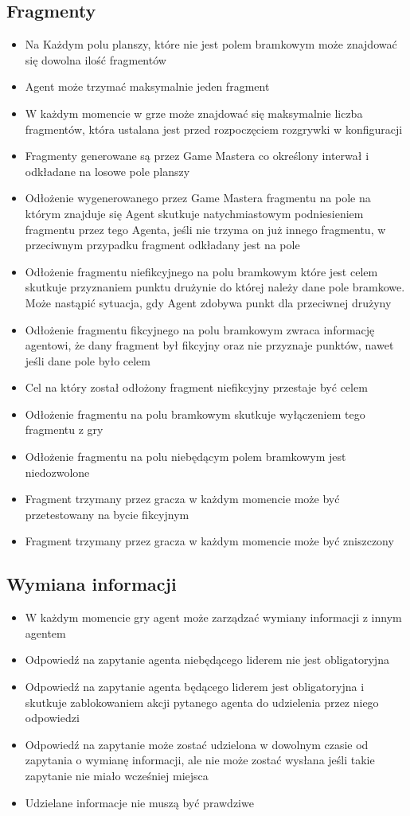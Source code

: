 \documentclass[Dokumentacja.tex]{subfiles}
\begin{document}
\subsection{Fragmenty}
\begin{itemize}
    \item Na Każdym polu planszy, które nie jest polem bramkowym może znajdować się dowolna ilość fragmentów
    \item Agent może trzymać maksymalnie jeden fragment
    \item W każdym momencie w grze może znajdować się maksymalnie liczba fragmentów, która ustalana jest przed rozpoczęciem rozgrywki w konfiguracji
    \item Fragmenty generowane są przez Game Mastera co określony interwał i odkładane na losowe pole planszy
    \item Odłożenie wygenerowanego przez Game Mastera fragmentu na pole na którym znajduje się Agent skutkuje natychmiastowym podniesieniem fragmentu przez tego Agenta, jeśli nie trzyma on już innego fragmentu, w przeciwnym przypadku fragment odkładany jest na pole
    \item Odłożenie fragmentu niefikcyjnego na polu bramkowym które jest celem skutkuje przyznaniem punktu drużynie do której należy dane pole bramkowe. Może nastąpić sytuacja, gdy Agent zdobywa punkt dla przeciwnej drużyny
    \item Odłożenie fragmentu fikcyjnego na polu bramkowym zwraca informację agentowi, że dany fragment był fikcyjny oraz nie przyznaje punktów, nawet jeśli dane pole było celem
    \item Cel na który został odłożony fragment niefikcyjny przestaje być celem
    \item Odłożenie fragmentu na polu bramkowym skutkuje wyłączeniem tego fragmentu z gry
    \item Odłożenie fragmentu na polu niebędącym polem bramkowym jest niedozwolone
    \item Fragment trzymany przez gracza w każdym momencie może być przetestowany na bycie fikcyjnym
    \item Fragment trzymany przez gracza w każdym momencie może być zniszczony
\end{itemize}
\subsection{Wymiana informacji}
\begin{itemize}
    \item W każdym momencie gry agent może zarządzać wymiany informacji z innym agentem
    \item Odpowiedź na zapytanie agenta niebędącego liderem nie jest obligatoryjna
    \item Odpowiedź na zapytanie agenta będącego liderem jest obligatoryjna i skutkuje zablokowaniem akcji pytanego agenta do udzielenia przez niego odpowiedzi
    \item Odpowiedź na zapytanie może zostać udzielona w dowolnym czasie od zapytania o wymianę informacji, ale nie może zostać wysłana jeśli takie zapytanie nie miało wcześniej miejsca
    \item Udzielane informacje nie muszą być prawdziwe
\end{itemize}
\end{document}
